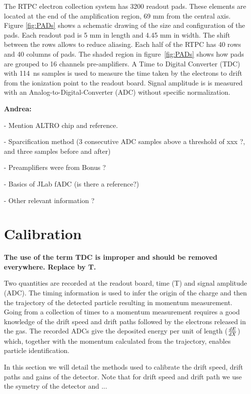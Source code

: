 \documentclass[twocolumn,showpacs,superscriptaddress,groupedaddress]{revtex4}
\begin{document}
The RTPC electron collection system has 3200 readout pads. These elements are
located at the end of the amplification region, 69 mm from the central axis.
Figure \ref{fig:PADs} shows a schematic drawing of the size and 
configuration of the pads. Each readout pad is 5 mm in length and 4.45 mm in 
width.  The shift between the rows allows to reduce aliasing. Each half of the 
RTPC has 40 rows and 40 columns of pads. The shaded region in figure~\ref{fig:PADs}
shows how pads are grouped to 16 channels pre-amplifiers.  A Time to Digital
Converter (TDC) with 114~ns samples is used to measure the time taken by
the electrons to drift from the ionization point to the readout board.  Signal
amplitude is is measured with an Analog-to-Digital-Converter (ADC) without
specific normalization. 

{\bf \color{red} 
Andrea:

- Mention ALTRO chip and reference.

- Sparcification method (3 consecutive ADC samples above a threshold of xxx ?, and three
samples before and after)

- Preamplifiers were from Bonus ?

- Basics of JLab fADC (is there a reference?)

- Other relevant information ?
}

\section{Calibration} \label{sec_calib}

{\bf \color{red} The use of the term TDC is improper and should be removed
everywhere. Replace by T.}

Two quantities are recorded at the readout board, 
time (T) and signal amplitude (ADC). The timing information is used to infer 
the origin of the charge and then the trajectory of the detected particle
resulting in momentum measurement. Going from a collection of 
times to a momentum measurement requires a good knowledge of the drift speed 
and drift paths followed by the electrons released in the gas. The recorded ADCs give 
the deposited energy per unit of length ($\small{\frac{dE}{dX}}$) which, 
together with the momentum calculated from the trajectory, enables particle 
identification.

In this section we will detail the methods used to calibrate the drift speed,
drift paths and gains of the detector. Note that for drift speed and drift
path we use the symetry of the detector and ...
\end{document}
